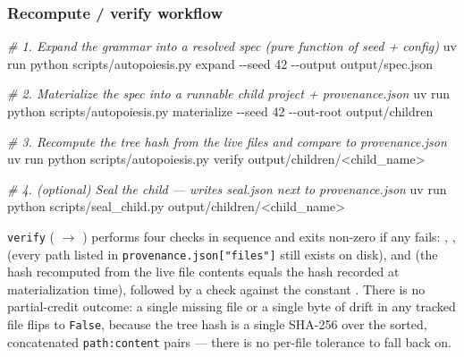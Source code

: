 \documentclass[
]{article}
\newenvironment{Shaded}{}{}
\newcommand{\AttributeTok}[1]{\textcolor[rgb]{0.49,0.56,0.16}{#1}}
\newcommand{\CommentTok}[1]{\textcolor[rgb]{0.38,0.63,0.69}{\textit{#1}}}
\newcommand{\ExtensionTok}[1]{#1}
\newcommand{\NormalTok}[1]{#1}
\newcommand{\OperatorTok}[1]{\textcolor[rgb]{0.40,0.40,0.40}{#1}}
\begin{document}
\subsubsection{Recompute / verify
workflow}\label{recompute-verify-workflow}

\begin{Shaded}
\begin{Highlighting}[]
\CommentTok{\# 1. Expand the grammar into a resolved spec (pure function of seed + config)}
\ExtensionTok{uv}\NormalTok{ run python scripts/autopoiesis.py expand }\AttributeTok{{-}{-}seed}\NormalTok{ 42 }\AttributeTok{{-}{-}output}\NormalTok{ output/spec.json}

\CommentTok{\# 2. Materialize the spec into a runnable child project + provenance.json}
\ExtensionTok{uv}\NormalTok{ run python scripts/autopoiesis.py materialize }\AttributeTok{{-}{-}seed}\NormalTok{ 42 }\AttributeTok{{-}{-}out{-}root}\NormalTok{ output/children}

\CommentTok{\# 3. Recompute the tree hash from the live files and compare to provenance.json}
\ExtensionTok{uv}\NormalTok{ run python scripts/autopoiesis.py verify output/children/}\OperatorTok{\textless{}}\NormalTok{child\_name}\OperatorTok{\textgreater{}}

\CommentTok{\# 4. (optional) Seal the child — writes seal.json next to provenance.json}
\ExtensionTok{uv}\NormalTok{ run python scripts/seal\_child.py output/children/}\OperatorTok{\textless{}}\NormalTok{child\_name}\OperatorTok{\textgreater{}}
\end{Highlighting}
\end{Shaded}

\texttt{verify} ( \texorpdfstring{\ensuremath{\to}}{->}
) performs four checks in
sequence and exits non-zero if any fails: ,
,  (every path
listed in \texttt{provenance.json{[}"files"{]}} still exists on disk),
and  (the hash recomputed from the live file
contents equals the hash recorded at materialization time), followed by
a  check against the constant
. There is no partial-credit
outcome: a single missing file or a single byte of drift in any tracked
file flips  to \texttt{False}, because the
tree hash is a single SHA-256 over the sorted, concatenated
\texttt{path:content} pairs --- there is no per-file tolerance to fall
back on.
\end{document}

